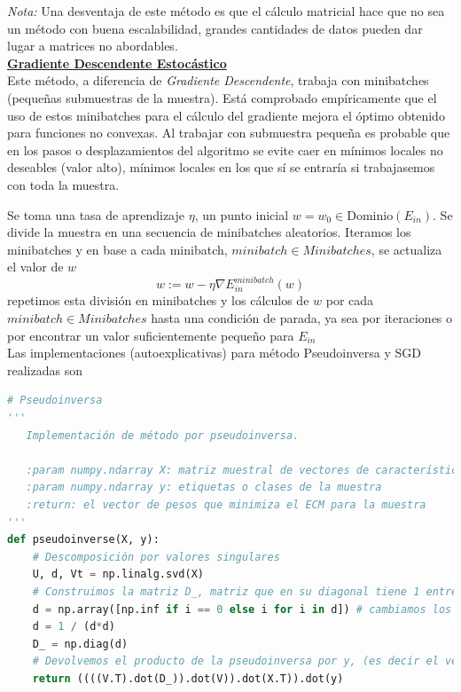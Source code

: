 \documentclass[11pt,a4paper]{article}
\theoremstyle{definition}
\begin{document}
	\textit{Nota:} Una desventaja de este método es que el cálculo matricial hace que no sea un método con buena escalabilidad, grandes cantidades de datos pueden dar lugar a matrices no abordables. \\

	\underline{\bf Gradiente Descendente Estocástico}\\
	
	Este método, a diferencia de \textit{Gradiente Descendente}, trabaja con minibatches (pequeñas submuestras de la muestra). Está comprobado empíricamente que el uso de estos minibatches para el cálculo del gradiente mejora el óptimo obtenido para funciones no convexas. Al trabajar con submuestra pequeña es probable que en los pasos o desplazamientos del algoritmo se evite caer en mínimos locales no deseables (valor alto), mínimos locales en los que sí se entraría si trabajasemos con toda la muestra.

	Se toma una tasa de aprendizaje $\eta$, un punto inicial $w=w_0\in \text{Dominio}(E_{in})$. Se divide la muestra en una secuencia de minibatches aleatorios. Iteramos los minibatches y en base a cada minibatch, $minibatch \in Minibatches$, se actualiza el valor de $w$
	$$w:=w-\eta \nabla E_{in}^{minibatch}(w)$$
	repetimos esta división en minibatches y los cálculos de $w$ por cada $minibatch \in Minibatches$ hasta una condición de parada, ya sea por iteraciones o por encontrar un valor suficientemente pequeño para $E_{in}$\\
	
	
	Las implementaciones (autoexplicativas) para método Pseudoinversa y SGD realizadas son
		\begin{lstlisting}[language=Python, caption= Implementaci\'on del m\'etodo por Pseudoinversa en Python, inputencoding=latin1]
  # Pseudoinversa	
'''
   Implementación de método por pseudoinversa.
   
   :param numpy.ndarray X: matriz muestral de vectores de características
   :param numpy.ndarray y: etiquetas o clases de la muestra
   :return: el vector de pesos que minimiza el ECM para la muestra
'''
def pseudoinverse(X, y):
    # Descomposición por valores singulares
    U, d, Vt = np.linalg.svd(X) 
    # Construimos la matriz D_, matriz que en su diagonal tiene 1 entre el cuadrado de cada valor singular o 0 si el valor singular es 0
    d = np.array([np.inf if i == 0 else i for i in d]) # cambiamos los ceros por np.inf (para dividir después y obtener D_)
    d = 1 / (d*d)
    D_ = np.diag(d)
    # Devolvemos el producto de la pseudoinversa por y, (es decir el vector de pesos que minimiza el ECM para la muestra)
    return ((((V.T).dot(D_)).dot(V)).dot(X.T)).dot(y)
	\end{lstlisting}
	
\end{document}
